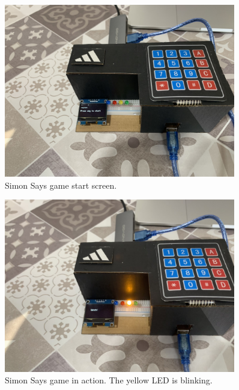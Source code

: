 \documentclass{article}
\begin{document}
\begin{figure}[!h]
  \centering
  \vspace*{\fill}
  \includegraphics[width=0.9\textwidth]{SimonSaysStart.jpg}
  \caption{Simon Says game start screen.}
  \vspace*{\fill}
\end{figure}

\newpage

\begin{figure}[!h]
  \centering
  \vspace*{\fill}
  \includegraphics[width=0.9\textwidth]{SimonSaysInGame.jpg}
  \caption{Simon Says game in action. The yellow LED is blinking.}
  \vspace*{\fill}
\end{figure}

\newpage
\end{document}
